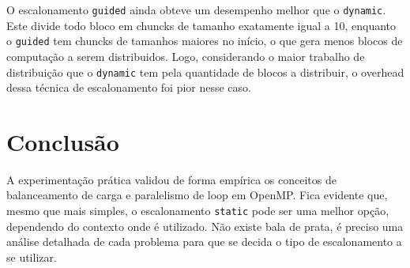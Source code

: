 \documentclass[12pt, a4paper]{article}
\begin{document}
    O escalonamento \texttt{guided} ainda obteve um desempenho melhor que o \texttt{dynamic}. Este divide todo bloco em chuncks de tamanho exatamente igual a 10, enquanto o \texttt{guided} tem chuncks de tamanhos maiores no início, o que gera menos blocos de computação a serem distribuidos. Logo, considerando o maior trabalho de distribuição que o \texttt{dynamic} tem pela quantidade de blocos a distribuir, o overhead dessa técnica de escalonamento foi pior nesse caso.


\section{Conclusão}
A experimentação prática validou de forma empírica os conceitos de balanceamento de carga e paralelismo de loop em OpenMP. Fica evidente que, mesmo que mais simples, o escalonamento \texttt{static} pode ser uma melhor opção, dependendo do contexto onde é utilizado. Não existe bala de prata, é preciso uma análise detalhada de cada problema para que se decida o tipo de escalonamento a se utilizar.
\end{document}
